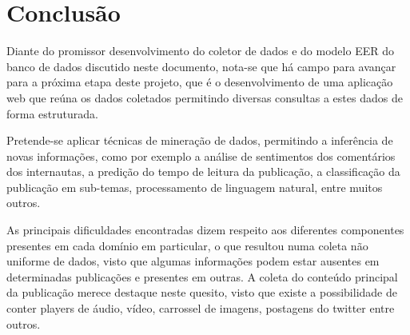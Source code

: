 
\section{Conclusão}
Diante do promissor desenvolvimento do coletor de dados e do modelo EER do banco de dados discutido neste documento, nota-se que há campo para avançar para a próxima etapa deste projeto, que é o desenvolvimento de uma aplicação web que reúna os dados coletados permitindo diversas consultas a estes dados de forma estruturada.

Pretende-se aplicar técnicas de mineração de dados, permitindo a inferência de novas informações, como por exemplo a análise de sentimentos dos comentários dos internautas, a predição do tempo de leitura da publicação, a classificação da publicação em sub-temas, processamento de linguagem natural, entre muitos outros.  

As principais dificuldades encontradas dizem respeito aos diferentes componentes presentes em cada domínio em particular, o que resultou numa coleta não uniforme de dados, visto que algumas informações podem estar ausentes em determinadas publicações e presentes em outras. A coleta do conteúdo principal da publicação merece destaque neste quesito, visto que existe a possibilidade de conter players de áudio, vídeo, carrossel de imagens, postagens do twitter entre outros.
